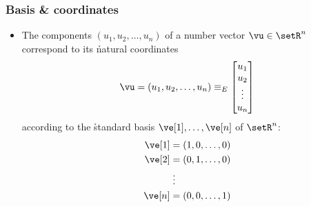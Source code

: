 \begin{frame}
  \frametitle{Basis \& coordinates}

  \begin{itemize}
  \item The components $(u_1, u_2, \ldots, u_n)$ of a number vector $\vu \in
    \setR^n$ correspond to its \h{natural coordinates}
    \[ 
    \vu = (u_1, u_2, \ldots, u_n)  \equiv_E
    \begin{bmatrix}
      u_1\\ u_2\\ \vdots\\ u_n
    \end{bmatrix}
    \]
    according to the \h{standard basis} $\ve[1], \ldots, \ve[n]$ of $\setR^n$:
    \begin{align*}
      \ve[1] &= (1, 0, \ldots, 0)\\
      \ve[2] &= (0, 1, \ldots, 0)\\
      & \;\vdots\\
      \ve[n] &= (0, 0, \ldots, 1)
    \end{align*}
  \end{itemize}
\end{frame}

